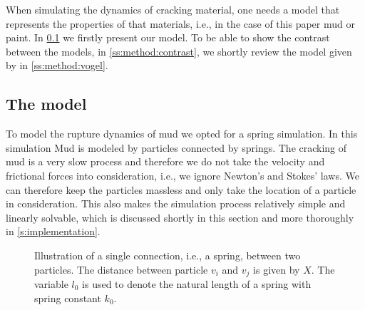 
When simulating the dynamics of cracking material, one needs a model that represents the properties of that materials, i.e., in the case of this paper mud or paint. In \cref{ss:method:model} we firstly present our model. To be able to show the contrast between the models, in \cref{ss:method:contrast}, we shortly review the model given by \citeauthor{vogel2005studies2} in \cref{ss:method:vogel}.

\subsection{The model}\label{ss:method:model}

To model the rupture dynamics of mud we opted for a spring simulation. In this simulation Mud is modeled by particles connected by springs. The cracking of mud is a very slow process and therefore we do not take the velocity and frictional forces into consideration, i.e., we ignore Newton's and Stokes' laws. We can therefore keep the particles massless and only take the location of a particle in consideration. This also makes the simulation process relatively simple and linearly solvable, which is discussed shortly in this section and more thoroughly in \cref{s:implementation}.

\begin{figure}
	\centering
	\caption{Illustration of a single connection, i.e., a spring, between two particles. The distance between particle $v_i$ and $v_j$ is given by $X$. The variable $l_0$ is used to denote the natural length of a spring with spring constant $k_0$.}
	\label{fig:method:spring}
\end{figure}


